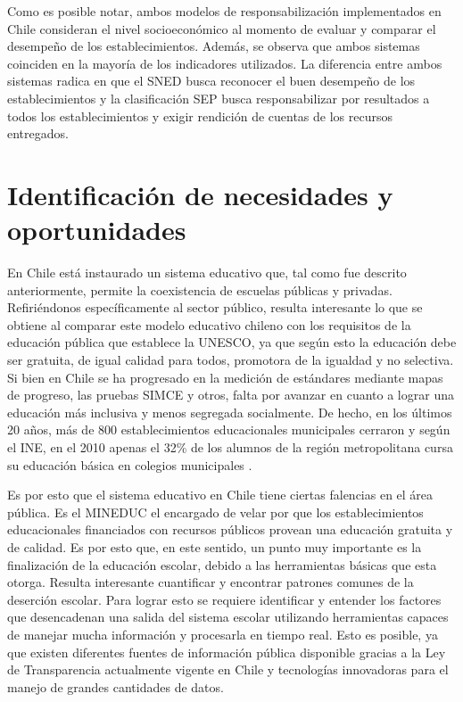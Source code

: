 Como es posible notar, ambos modelos de responsabilización implementados en Chile consideran el nivel socioeconómico al momento de evaluar y comparar el desempeño de los establecimientos. Además, se observa que ambos sistemas coinciden en la mayoría de los indicadores utilizados. La diferencia entre ambos sistemas radica en que el SNED busca reconocer el buen desempeño de los establecimientos y la clasificación SEP busca responsabilizar por resultados a todos los establecimientos y exigir rendición de cuentas de los recursos entregados.

\section{Identificación de necesidades y oportunidades}
En Chile está instaurado un sistema educativo que, tal como fue descrito anteriormente, permite la coexistencia de escuelas públicas y privadas. Refiriéndonos específicamente al sector público, resulta interesante lo que se obtiene al comparar este modelo educativo chileno con los requisitos de la educación pública que establece la UNESCO, ya que según esto la educación debe ser gratuita, de igual calidad para todos, promotora de la igualdad y no selectiva. Si bien en Chile se ha progresado en la medición de estándares mediante mapas de progreso, las pruebas SIMCE y otros, falta por avanzar en cuanto a lograr una educación más inclusiva y menos segregada socialmente. De hecho, en los últimos 20 años, más de 800 establecimientos educacionales municipales cerraron \cite{biobio} y según el INE, en el 2010 apenas el 32\% de los alumnos de la región metropolitana cursa su educación básica en colegios municipales \cite{ine}. 

Es por esto que el sistema educativo en Chile tiene ciertas falencias en el área pública. Es el MINEDUC el encargado de velar por que los establecimientos educacionales financiados con recursos públicos provean una educación gratuita y de calidad. Es por esto que, en este sentido, un punto muy importante es la finalización de la educación escolar, debido a las herramientas básicas que esta otorga. Resulta interesante cuantificar y encontrar patrones comunes de la deserción escolar. Para lograr esto se requiere identificar y entender los factores que desencadenan una salida del sistema escolar utilizando herramientas capaces de manejar mucha información y procesarla en tiempo real. Esto es posible, ya que existen diferentes fuentes de información pública disponible gracias a la Ley de Transparencia \cite{ley} actualmente vigente en Chile y tecnologías innovadoras para el manejo de grandes cantidades de datos.

